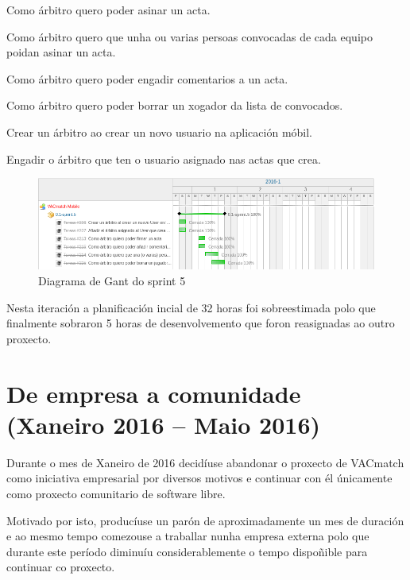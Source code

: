         \begin{description}
         \item [S5.1] Como árbitro quero poder asinar un acta.
         \item [S5.2] Como árbitro quero que unha ou varias persoas convocadas 
de cada equipo poidan asinar un acta.
         \item [S5.3] Como árbitro quero poder engadir comentarios a un acta.
         \item [S5.4] Como árbitro quero poder borrar un xogador da lista de 
convocados.
         \item Crear un árbitro ao crear un novo usuario na aplicación móbil.
         \item Engadir o árbitro que ten o usuario asignado nas actas que crea.
        \end{description}

        \begin{figure}[h!]
          \begin{center}
          \includegraphics[width=\textwidth]{./img/gant_diagrams/05.png}
          \caption{Diagrama de Gant do sprint 5}
          \label{fig:gant05}
          \end{center}
        \end{figure}

        Nesta iteración a planificación incial de 32 horas foi sobreestimada 
polo que finalmente sobraron 5 horas de desenvolvemento que foron reasignadas 
ao outro proxecto.

  \section{De empresa a comunidade (Xaneiro 2016 -- Maio 2016)}
  Durante o mes de Xaneiro de 2016 decidíuse abandonar o proxecto de VACmatch 
como iniciativa empresarial por diversos motivos e continuar con él únicamente 
como proxecto comunitario de software libre.

  Motivado por isto, producíuse un parón de aproximadamente un mes de duración 
e ao mesmo tempo comezouse a traballar nunha empresa externa polo que durante 
este período diminuíu considerablemente o tempo dispoñible para continuar co 
proxecto.

